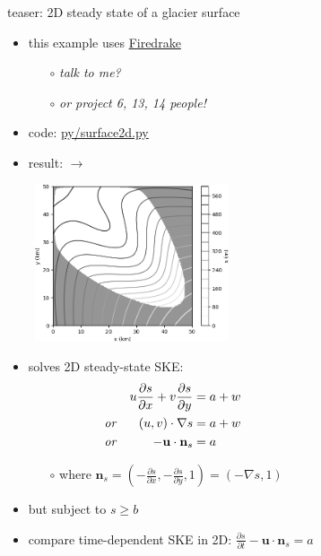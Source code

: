 \documentclass[10pt,dvipsnames]{beamer}
\newcommand{\bn}{\mathbf{n}}
\newcommand{\bu}{\mathbf{u}}
\newcommand{\grad}{\nabla}
\begin{document}
\begin{frame}{teaser: 2D steady state of a glacier surface}

\begin{itemize}
\item this example uses \href{https://www.firedrakeproject.org/}{Firedrake}
{\footnotesize
    \begin{itemize}
    \item[$\circ$] \emph{talk to me?}
    \item[$\circ$] \emph{or project 6, 13, 14 people!}
    \end{itemize}
}
\item code: \href{https://github.com/bueler/mccarthy/blob/master/py/surface2d.py}{py/surface2d.py}

\item result: $\rightarrow$

\vspace{-25mm}
\mbox{\hspace{60mm} \includegraphics[width=0.45\textwidth]{surface2d}}

\vspace{-12mm}
\item solves 2D steady-state SKE:
\begin{align*}
&& u \frac{\partial s}{\partial x} + v \frac{\partial s}{\partial y} &= a + w \hspace{40mm}\\
\text{\emph{or}} && (u,v) \cdot \grad s &= a + w \\
\text{\emph{or}} && -\bu \cdot \bn_s &= a
\end{align*}

{\footnotesize
    \begin{itemize}
    \item[$\circ$] where $\bn_s = (-\frac{\partial s}{\partial x},-\frac{\partial s}{\partial y},1) = (-\grad s,1)$
    \end{itemize}
}

\smallskip
\item \alert{but subject to $s \ge b$}

\medskip
\item compare time-dependent SKE in 2D: \quad $\displaystyle \frac{\partial s}{\partial t} - \bu \cdot \bn_s = a$
\end{itemize}
\end{frame}
\end{document}
